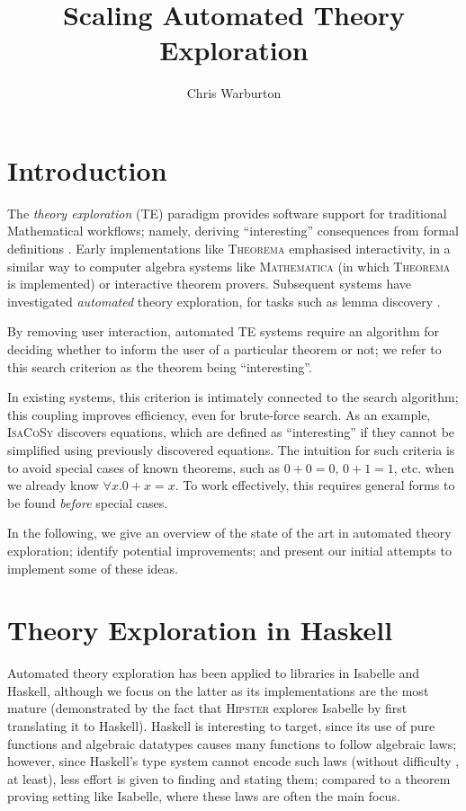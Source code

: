 \documentclass{eceasst}
\title{Scaling Automated Theory Exploration} %
\author{Chris Warburton\sponsor{}} %
\institute{ %
\email{cmwarburton@dundee.ac.uk}\\
School of Computing\\
University of Dundee}
\begin{document}
\maketitle

\section{Introduction}

The \emph{theory exploration} (TE) paradigm provides software support
for traditional Mathematical workflows; namely, deriving ``interesting''
consequences from formal definitions \cite{RISC1482}. Early
implementations like \textsc{Theorema} \cite{buchberger2000theory} emphasised
interactivity, in a similar way to computer algebra systems like
\textsc{Mathematica} (in which \textsc{Theorema} is implemented) or
interactive theorem provers. Subsequent systems have investigated
\emph{automated} theory exploration, for tasks such as lemma discovery
\cite{Hipster}.

By removing user interaction, automated TE systems require an algorithm
for deciding whether to inform the user of a particular theorem or not; we refer
to this search criterion as the theorem being ``interesting''.

In existing systems, this criterion is intimately connected to the
search algorithm; this coupling improves efficiency, even for brute-force
search. As an example, \textsc{IsaCoSy} \cite{johansson2009isacosy} discovers
equations, which are defined as ``interesting'' if they cannot be simplified
using previously discovered equations. The intuition for such criteria is to
avoid special cases of known theorems, such as $0 + 0 = 0$, $0 + 1 = 1$,
etc. when we already know $\forall x. 0 + x = x$. To work effectively, this
requires general forms to be found \emph{before} special cases.

In the following, we give an overview of the state of the art in automated
theory exploration; identify potential improvements; and present our initial
attempts to implement some of these ideas.

\section{Theory Exploration in Haskell}

Automated theory exploration has been applied to libraries in Isabelle
and Haskell, although we focus on the latter as its implementations are
the most mature (demonstrated by the fact that \textsc{Hipster} explores
Isabelle by first translating it to Haskell). Haskell is interesting to target,
since its use of pure functions and algebraic datatypes causes many functions to
follow algebraic laws; however, since Haskell's type system cannot encode such
laws (without difficulty \cite{lindley2014hasochism}, at least), less
effort is given to finding and stating them; compared to a theorem proving
setting like Isabelle, where these laws are often the main focus.
\end{document}

